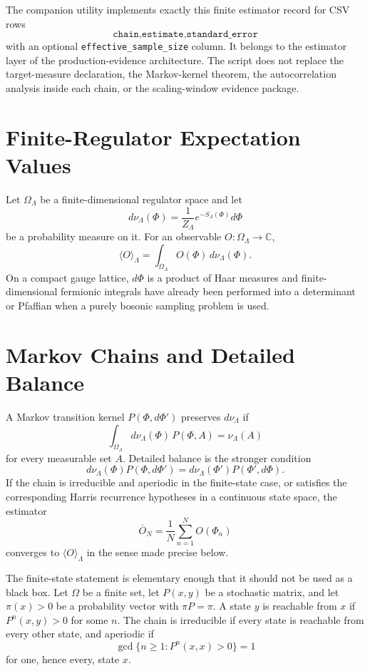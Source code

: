 The companion utility
 implements exactly this
finite estimator record for CSV rows
\[
  \texttt{chain,estimate,standard\_error}
\]
with an optional \texttt{effective\_sample\_size} column.  It belongs to the
estimator layer of the production-evidence architecture.  The script does not
replace the target-measure declaration, the Markov-kernel theorem, the
autocorrelation analysis inside each chain, or the scaling-window evidence
package.

\section{Finite-Regulator Expectation Values}

Let \(\Omega_\Lambda\) be a finite-dimensional regulator space and let
\[
  d\nu_\Lambda(\Phi)=\frac{1}{Z_\Lambda}e^{-S_\Lambda(\Phi)}d\Phi
\]
be a probability measure on it.  For an observable \(O:\Omega_\Lambda\to\mathbb C\),
\[
  \langle O\rangle_\Lambda
  =
  \int_{\Omega_\Lambda}O(\Phi)\,d\nu_\Lambda(\Phi).
\]
On a compact gauge lattice, \(d\Phi\) is a product of Haar measures and
finite-dimensional fermionic integrals have already been performed into a
determinant or Pfaffian when a purely bosonic sampling problem is used.

\section{Markov Chains and Detailed Balance}

A Markov transition kernel \(P(\Phi,d\Phi')\) preserves \(d\nu_\Lambda\) if
\[
  \int_{\Omega_\Lambda}d\nu_\Lambda(\Phi)\,P(\Phi,A)
  =
  \nu_\Lambda(A)
\]
for every measurable set \(A\).  Detailed balance is the stronger condition
\[
  d\nu_\Lambda(\Phi)P(\Phi,d\Phi')
  =
  d\nu_\Lambda(\Phi')P(\Phi',d\Phi).
\]
If the chain is irreducible and aperiodic in the finite-state case, or
satisfies the corresponding Harris recurrence hypotheses in a continuous
state space, the estimator
\[
  \overline O_N=\frac1N\sum_{n=1}^N O(\Phi_n)
\]
converges to \(\langle O\rangle_\Lambda\) in the sense made precise below.

The finite-state statement is elementary enough that it should not be used as
a black box.  Let \(\Omega\) be a finite set, let \(P(x,y)\) be a stochastic
matrix, and let \(\pi(x)>0\) be a probability vector with \(\pi P=\pi\).  A
state \(y\) is reachable from \(x\) if \(P^n(x,y)>0\) for some \(n\).  The
chain is irreducible if every state is reachable from every other state, and
aperiodic if
\[
  \gcd\{n\geq1:P^n(x,x)>0\}=1
\]
for one, hence every, state \(x\).

